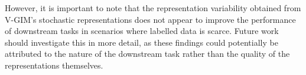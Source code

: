 However, it is important to note that the representation variability obtained from V-GIM's stochastic representations does not appear to improve the performance of downstream tasks in scenarios where labelled data is scarce. Future work should investigate this in more detail, as these findings could potentially be attributed to the nature of the downstream task rather than the quality of the representations themselves.

%











%	
%	
%	
%

%
%
%

%
%



